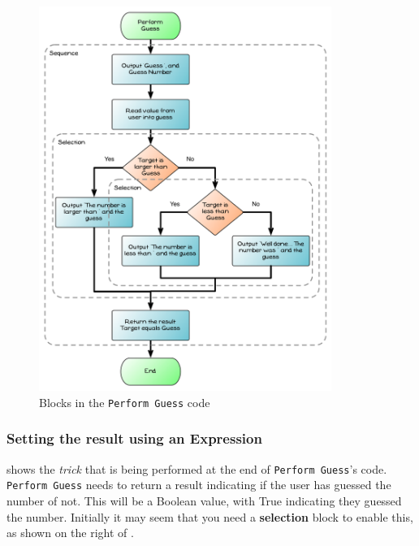 \begin{figure}[htbp]
   \centering
   \includegraphics[width=0.85\textwidth]{./topics/control-flow/diagrams/PerformGuess7} 
   \caption{Blocks in the \texttt{Perform Guess} code}
   \label{fig:perform-guess-seq-7}
\end{figure}



\clearpage
\subsubsection{Setting the result using an Expression} %
\label{ssub:setting_the_result_using_an_expression}

 shows the \emph{trick} that is being performed at the end of \texttt{Perform Guess}'s code. \texttt{Perform Guess} needs to return a result indicating if the user has guessed the number of not. This will be a Boolean value, with True indicating they guessed the number. Initially it may seem that you need a \textbf{selection} block to enable this, as shown on the right of . 

